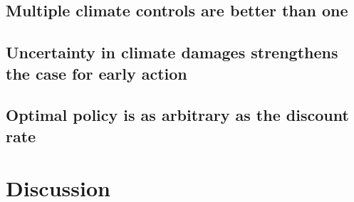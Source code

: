 \documentclass{article}
\begin{document}
\subsection{Multiple climate controls are better than one}

\subsection{Uncertainty in climate damages strengthens the case for early action}

\subsection{Optimal policy is as arbitrary as the discount rate}

\section{Discussion}



%

\end{document}
